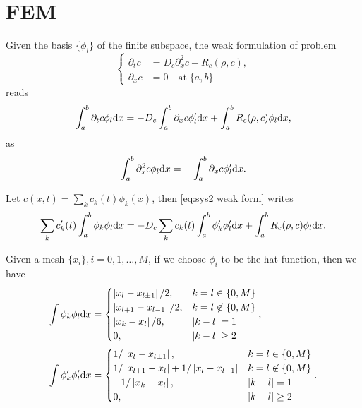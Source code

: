 \documentclass{article}
\begin{document}
  \section{FEM}
  Given the basis $\{\phi_l\}$ of the finite subspace, the weak formulation of problem
  \[
    \left\{
      \begin{aligned}
        \partial_t c &= D_c \partial_x^2 c + R_c(\rho, c), \\
        \partial_x c &= 0\quad\text{at}\;\{a,b\}
      \end{aligned}
    \right.
  \]
  reads
  \begin{equation}
    \label{eq:sys2 weak form}
    \int_a^b \partial_t c \phi_l\mathrm d x = - D_c\int_a^b \partial_x c\phi_l'\mathrm d x
                                          + \int_a^b R_c(\rho, c)\phi_l\mathrm d x,
  \end{equation}
  as
  \[
    \int_a^b \partial^2_x c\phi_l \mathrm d x = - \int_a^b \partial_x c\phi_l'\mathrm d x.
  \]

  Let $c(x, t) = \sum_k c_k(t)\phi_k(x)$, then \cref{eq:sys2 weak form} writes
  \[
    \sum_k c'_k(t)\int_a^b\phi_k\phi_l\mathrm d x = - D_c\sum_k c_k(t)\int_a^b\phi_k'\phi_l'\mathrm d x
                                                + \int_a^b R_c(\rho, c)\phi_l\mathrm d x.
  \]

  Given a mesh $\{x_i\},i = 0, 1, \ldots, M$, if we choose $\phi_i$ to be the hat function,
  then we have
  \[
    \begin{aligned}
      \int\phi_k\phi_l\mathrm d x &=
      \begin{cases}
        \left|x_l - x_{l \pm 1}\right| / 2,     &k = l \in \{0, M\} \\
        \left|x_{l + 1} - x_{l - 1}\right| / 2, &k = l \not\in \{0, M\} \\
        \left|x_k - x_l\right| / 6,             &|k - l| = 1 \\
        0,                                      &|k - l| \geq 2
      \end{cases}, \\
      \int\phi_k'\phi_l'\mathrm d x &=
      \begin{cases}
        1 / \left|x_l - x_{l \pm 1}\right|, &k = l \in \{0, M\} \\
        1 / \left|x_{l + 1} - x_l\right| + 1 / \left|x_l - x_{l - 1}\right|
                                            &k = l \not\in \{0, M\} \\
        -1 / \left|x_k - x_l\right|,        &|k - l| = 1 \\
        0,                                  &|k - l| \geq 2
      \end{cases}.
    \end{aligned}
  \]
\end{document}

